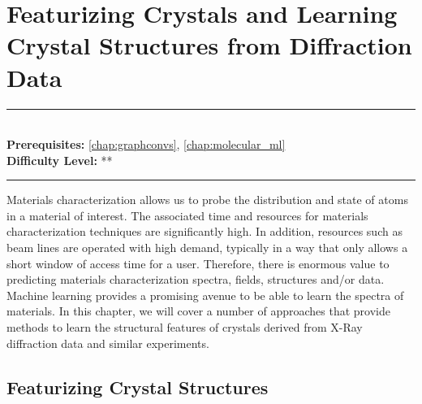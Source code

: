 \documentclass[book.tex]{subfiles}
\begin{document}
\chapter{Featurizing Crystals and Learning Crystal Structures from Diffraction Data}
\label{chap:spectroscopy}
\noindent\rule{11cm}{0.4pt} \\
\textbf{Prerequisites:} \autoref{chap:graphconvs}, \autoref{chap:molecular_ml}   \\
\textbf{Difficulty Level:} ** \\
\noindent\rule{11cm}{0.4pt}
\vspace{5mm}


Materials characterization allows us to probe the distribution and state of atoms in a material of interest. The associated time and resources for materials characterization techniques are significantly high. In addition, resources such as beam lines are operated with high demand, typically in a way that only allows a short window of access time for a user. Therefore, there is enormous value to predicting materials characterization spectra, fields, structures and/or data. Machine learning provides a promising avenue to be able to learn the spectra of materials.
In this chapter, we will cover a number of approaches that provide methods to learn the structural features of crystals derived from X-Ray diffraction data and similar experiments.  

\section{Featurizing Crystal Structures}
\end{document}
